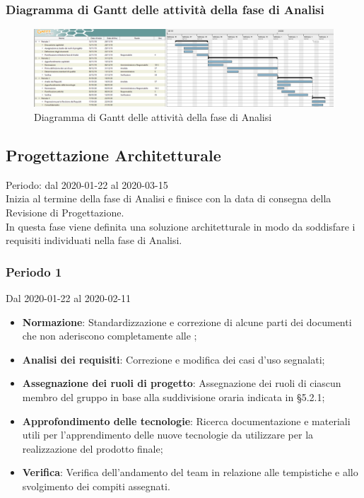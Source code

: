 \newpage
\begin{landscape}
\subsubsection{Diagramma di Gantt delle attività della fase di Analisi}
\pagestyle{empty}
\begin{figure}[h]
	\centering	
	\includegraphics[scale=0.455]{Sezioni/DiagrammiGantt/Analisi.png}
	\caption{Diagramma di Gantt delle attività della fase di Analisi}
\end{figure}
\end{landscape}
\clearpage

\subsection{Progettazione Architetturale}
Periodo: dal 2020-01-22 al 2020-03-15\\
Inizia al termine della fase di Analisi e finisce con la data di consegna della Revisione di Progettazione.\\
In questa fase viene definita una soluzione architetturale in modo da soddisfare i requisiti individuati nella fase di Analisi.

\subsubsection{Periodo 1} 
Dal 2020-01-22 al 2020-02-11
\begin{itemize}
	\item \textbf{Normazione}: Standardizzazione e correzione di alcune parti dei documenti che non aderiscono completamente alle \NdP{};
	\item \textbf{Analisi dei requisiti}: Correzione e modifica dei casi d'uso segnalati;
	\item \textbf{Assegnazione dei ruoli di progetto}: Assegnazione dei ruoli di ciascun membro del gruppo in base alla suddivisione oraria indicata in §5.2.1;
	\item \textbf{Approfondimento delle tecnologie}: Ricerca documentazione e materiali utili per l'apprendimento delle nuove tecnologie da utilizzare per la realizzazione del prodotto finale;
	\item \textbf{Verifica}: Verifica dell'andamento del team in relazione alle tempistiche e allo svolgimento dei compiti assegnati.
\end{itemize}
